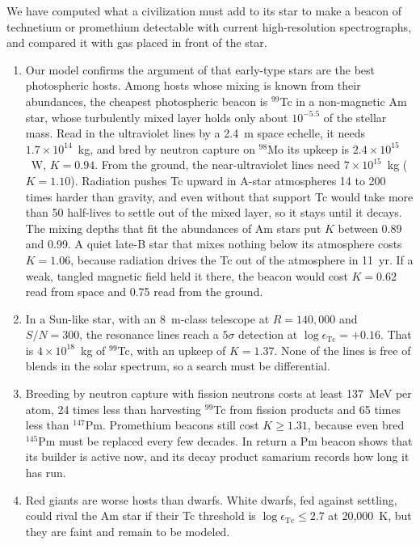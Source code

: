 \documentclass[final,5p]{elsarticle}
\begin{document}
We have computed what a civilization must add to its star to make a beacon of technetium or promethium detectable with current high-resolution spectrographs, and compared it with gas placed in front of the star.
\begin{enumerate}
\item Our model confirms the argument of \citet{Whitmire1980} that early-type stars are the best photospheric hosts. Among hosts whose mixing is known from their abundances, the cheapest photospheric beacon is $^{99}$Tc in a non-magnetic Am star, whose turbulently mixed layer holds only about $10^{-5.5}$ of the stellar mass. Read in the  ultraviolet lines by a 2.4~m space echelle, it needs $1.7\times10^{14}$~kg, and bred by neutron capture on $^{98}$Mo its upkeep is $2.4\times10^{15}$~W, $K = 0.94$. From the ground, the near-ultraviolet  lines need $7\times10^{15}$~kg ($K = 1.10$). Radiation pushes Tc upward in A-star atmospheres 14 to 200 times harder than gravity, and even without that support Tc would take more than 50 half-lives to settle out of the mixed layer, so it stays until it decays. The mixing depths that fit the abundances of Am stars put $K$ between 0.89 and 0.99. A quiet late-B star that mixes nothing below its atmosphere costs $K = 1.06$, because radiation drives the Tc out of the atmosphere in 11~yr. If a weak, tangled magnetic field held it there, the beacon would cost $K = 0.62$ read from space and 0.75 read from the ground.
\item In a Sun-like star, with an 8~m-class telescope at $R = 140{,}000$ and $S/N = 300$, the  resonance lines reach a $5\sigma$ detection at $\log\epsilon_\mathrm{Tc} = +0.16$. That is $4\times10^{18}$~kg of $^{99}$Tc, with an upkeep of $K = 1.37$. None of the  lines is free of blends in the solar spectrum, so a search must be differential.
\item Breeding by neutron capture with fission neutrons costs at least 137~MeV per atom, 24 times less than harvesting $^{99}$Tc from fission products and 65 times less than $^{147}$Pm. Promethium beacons still cost $K \geq 1.31$, because even bred $^{145}$Pm must be replaced every few decades. In return a Pm beacon shows that its builder is active now, and its decay product samarium records how long it has run.
\item Red giants are worse hosts than dwarfs. White dwarfs, fed against settling, could rival the Am star if their Tc threshold is $\log\epsilon_\mathrm{Tc} \leq 2.7$ at 20{,}000~K, but they are faint and remain to be modeled.

\end{enumerate}
\end{document}
